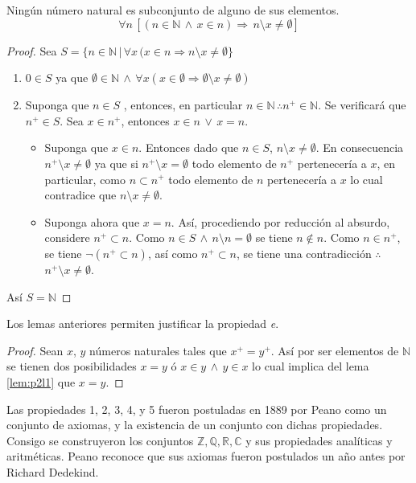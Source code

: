     \begin{lemma}
        Ningún número natural es subconjunto de alguno de sus elementos.
        \[
            \forall n \, [(n \in \mathbb{N} \, \land \, x \in n) \Rightarrow \,
            n  \setminus x \neq \emptyset]
        \]
    \end{lemma}
    \begin{proof}
        Sea $S = \{ n \in \mathbb{N} \, | \, \forall x \, (x \in n \Rightarrow n
     \setminus x \neq \emptyset\}$
    \begin{enumerate}
        \item $ 0 \in S$ ya que $\emptyset \in \mathbb{N} \, \land \, \forall x
            (x \in \emptyset \Rightarrow \emptyset  \setminus x \neq \emptyset )$
        \item Suponga que $n \in S$ , entonces, en particular $n \in \mathbb{N}
            \, \therefore n^+ \in \mathbb{N}$. Se verificará que $ n^+ \in S$.
            Sea $x \in n^+$, entonces $x \in n \, \lor \, x = n$. 
            \begin{itemize}
                \item Suponga que $x \in n$. Entonces dado que $n \in S$, $n  \setminus x
                    \neq \emptyset$. En consecuencia $n^+  \setminus x \neq \emptyset$ ya
                que si $n^+  \setminus x = \emptyset$ todo elemento de $n^+$ pertenecería
                a $x$, en particular, como $n \subset n^+ $ todo elemento de $n$
                pertenecería a $x$ lo cual contradice que $ n  \setminus x \neq
                \emptyset$. 
            \item Suponga ahora que $x=n$. Así, procediendo por reducción al
                absurdo, considere $n^+ \subset n$. Como $ n \in S \, \land \, n
                 \setminus n = \emptyset$ se tiene $n \notin n$. Como $n \in n^+$, se
                tiene
                $ \neg(n^+ \subset n)$, así como $n^+ \subset n$, se tiene una
                contradicción $\therefore$ $n^+  \setminus x \neq \emptyset$.
        \end{itemize}
    \end{enumerate}
    Así $S = \mathbb{N}$
    \end{proof}
    Los lemas anteriores permiten justificar la propiedad \textit{e}.
    \begin{proof}
        Sean $x$, $y$ números naturales tales que $x^+ = y^+$.  Así por ser
        elementos de $\mathbb{N}$ se tienen dos posibilidades $x=y$ ó $x \in y
        \, \land \, y \in x$ lo cual implica del lema \ref{lem:p2l1} que $x=y$.
    \end{proof}
    Las propiedades 1, 2, 3, 4, y 5 fueron postuladas en 1889 por Peano como un
    conjunto de axiomas, y la existencia de un conjunto con dichas propiedades.
    Consigo se construyeron los conjuntos
    $\mathbb{Z},\mathbb{Q},\mathbb{R},\mathbb{C}$ y sus propiedades analíticas y
    aritméticas. Peano reconoce que sus axiomas fueron postulados un año antes
    por Richard Dedekind.
    \vspace{1cm}
    \hline
    \vspace{1cm}
    

